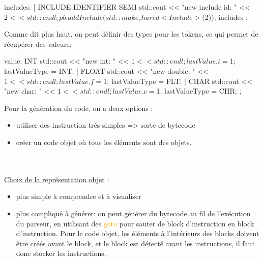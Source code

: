 \documentclass[a4paper]{article}
\begin{document}
\begin{code}[language=c++]
includes: %
       |
       INCLUDE IDENTIFIER SEMI
       {
         std::cout << "new include id: " << $2 << std::endl;
         pb.addInclude(std::make_shared<Include>($2));
       }
       includes
       ;
\end{code}\leavevmode\newline


Comme dit plus haut, on peut définir des types pour les tokens, ce qui permet de
récupérer des valeurs:

\begin{code}[language=c++]
value: INT {
       std::cout << "new int: " << $1 << std::endl;
       lastValue.i = $1;
       lastValueType = INT;
     } | FLOAT {
       std::cout << "new double: " << $1 << std::endl;
       lastValue.f = $1;
       lastValueType = FLT;
     } | CHAR {
       std::cout << "new char: " << $1 << std::endl;
       lastValue.c = $1;
       lastValueType = CHR;
     }
     ;
\end{code}\leavevmode\newline

Pour la génération du code, on a deux options :
\begin{itemize}
\item utiliser des instruction très simples => sorte de bytecode
\item créer un code objet où tous les éléments sont des objets.
\end{itemize}\leavevmode\\~\\

\underline{Choix de la représentation objet} :
\begin{itemize}
\item plus simple à comprendre et à visualiser
\item plus compliqué à générer: on peut générer du bytecode au fil de l'exécution du parseur, en utilisant des \textcolor{orange}{goto} pour sauter de block d'instruction en block d'instruction. Pour le code objet, les éléments à l'intérieurs des blocks doivent être créés avant le block, et le block est détecté avant les instructions, il faut donc stocker les instructions.
\end{itemize}


\clearpage{}

\printbibliography[keyword={paper},title={Biliographie}]
\printbibliography[keyword={web},title={Webographie}]
\end{document}
